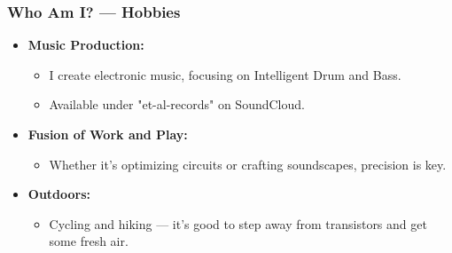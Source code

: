 \begin{frame}
	\frametitle{Who Am I? — Hobbies}
	\begin{itemize}
		\item \textbf{Music Production:}
		\begin{itemize}
			\item I create electronic music, focusing on Intelligent Drum and Bass.
			\item Available under "et-al-records" on SoundCloud.
		\end{itemize}
		\item \textbf{Fusion of Work and Play:}
		\begin{itemize}
			\item Whether it's optimizing circuits or crafting soundscapes, precision is key.
		\end{itemize}
		\item \textbf{Outdoors:}
		\begin{itemize}
			\item Cycling and hiking — it’s good to step away from transistors and get some fresh air.
		\end{itemize}
	\end{itemize}
\end{frame}
